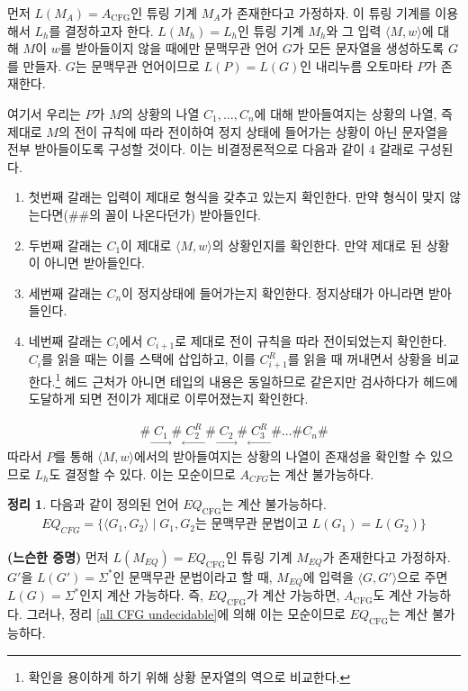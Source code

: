 \documentclass[b5paper, 11pt]{book}
\theoremstyle{definition}
\newtheorem{thm}[defn]{정리}
\newenvironment{pf*}{\pushQED{\qed}\pf}
{\popQED\endpf}
\begin{document}
\begin{pf*}
    먼저 $L(M_A) = A_\text{CFG}$인 튜링 기계 $M_A$가 존재한다고 가정하자. 이 튜링 기계를 이용해서 $L_h$를 결정하고자 한다. $L(M_h) = L_h$인 튜링 기계 $M_h$와 그 입력 $\langle M, w\rangle$에 대해 $M$이 $w$를 받아들이지 않을 때에만 문맥무관 언어 $G$가 모든 문자열을 생성하도록 $G$를 만들자. $G$는 문맥무관 언어이므로 $L(P) = L(G)$인 내리누름 오토마타 $P$가 존재한다. 

    여기서 우리는 $P$가 $M$의 상황의 나열 $C_1, \ldots, C_n$에 대해 받아들여지는 상황의 나열, 즉 제대로 $M$의 전이 규칙에 따라 전이하여 정지 상태에 들어가는 상황이 아닌 문자열을 전부 받아들이도록 구성할 것이다. 이는 비결정론적으로 다음과 같이 4 갈래로 구성된다. 
    \begin{enumerate}
        \item 첫번째 갈래는 입력이 제대로 형식을 갖추고 있는지 확인한다. 만약 형식이 맞지 않는다면(\#\#의 꼴이 나온다던가) 받아들인다.
        \item 두번째 갈래는 $C_1$이 제대로 $\langle M, w\rangle$의 상황인지를 확인한다. 만약 제대로 된 상황이 아니면 받아들인다.
        \item 세번째 갈래는 $C_n$이 정지상태에 들어가는지 확인한다. 정지상태가 아니라면 받아들인다.
        \item 네번째 갈래는 $C_i$에서 $C_{i+1}$로 제대로 전이 규칙을 따라 전이되었는지 확인한다. $C_i$를 읽을 때는 이를 스택에 삽입하고, 이를 $C_{i+1}^R$를 읽을 때 꺼내면서 상황을 비교한다.\footnote{확인을 용이하게 하기 위해 상황 문자열의 역으로 비교한다.} 헤드 근처가 아니면 테입의 내용은 동일하므로 같은지만 검사하다가 헤드에 도달하게 되면 전이가 제대로 이루어졌는지 확인한다.
    \end{enumerate}
    \begin{align*}
        \# \underset{\rightarrow}{\; C_1\;} \#  \underset{\leftarrow}{\; C_2^R\; } \# \underset{\rightarrow}{\; C_2 \;} \# \underset{\leftarrow}{\; C_3^R \;}\#\ldots \# C_n \#
    \end{align*}
    따라서 $P$를 통해 $\langle M, w \rangle $에서의 받아들여지는 상황의 나열이 존재성을 확인할 수 있으므로 $L_h$도 결정할 수 있다. 이는 모순이므로 $A_{CFG}$는 계산 불가능하다.
\end{pf*}
\begin{thm}
    다음과 같이 정의된 언어 $EQ_\text{CFG}$는 계산 불가능하다.
    \begin{align*}
        EQ_{CFG} = \{ \langle G_1, G_2 \rangle \;\vert\; G_1, G_2 \text{는 문맥무관 문법이고 } L(G_1) = L(G_2) \}
    \end{align*}
\end{thm}
\begin{pf*}
    \textbf{(느슨한 증명)}
    먼저 $L(M_{EQ}) = EQ_\text{CFG}$인 튜링 기계 $M_{EQ}$가 존재한다고 가정하자. $G'$을 $L(G') = \Sigma^*$인 문맥무관 문법이라고 할 때, $M_{EQ}$에 입력을 $\langle G, G' \rangle$으로 주면 $L(G) = \Sigma^*$인지 계산 가능하다. 즉, $EQ_\text{CFG}$가 계산 가능하면, $A_\text{CFG}$도 계산 가능하다. 그러나, 정리 \ref{all CFG undecidable}에 의해 이는 모순이므로 $EQ_\text{CFG}$는 계산 불가능하다.
\end{pf*}
\end{document}
